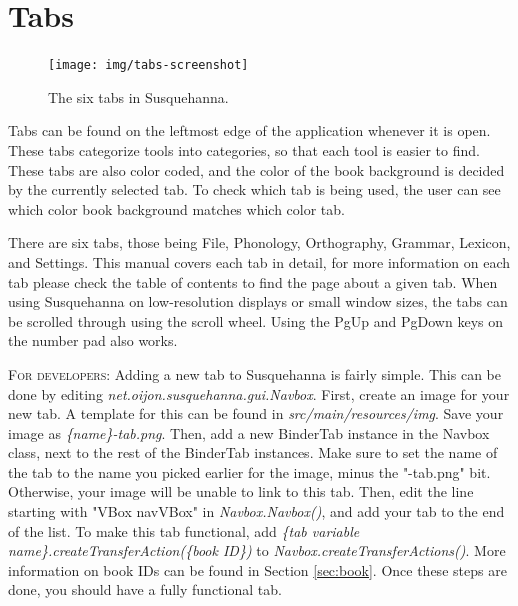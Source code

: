 \documentclass{report}
\begin{document}
	\section{Tabs}\label{sec:tabs}
	\begin{figure}
		\centering
		\texttt{[image: img/tabs-screenshot]}
		\caption{The six tabs in Susquehanna.}
		\label{fig:tabs-screenshot}
	\end{figure}
	Tabs can be found on the leftmost edge of the application whenever it is open. These tabs categorize tools into categories,	so that each tool is easier to find. These tabs are also color coded, and the color of the book background is decided by the currently selected tab. To check which tab is being used, the user can see which color book background matches which color tab.
	\par
	There are six tabs, those being File, Phonology, Orthography, Grammar, Lexicon, and Settings. This manual covers each tab in detail, for more information on each tab please check the table of contents to find the page about a given tab. When using Susquehanna on low-resolution displays or small window sizes, the tabs can be scrolled through using the scroll wheel. Using the PgUp and PgDown keys on the number pad also works. 
	\par
	\begin{tcolorbox}[width=1\textwidth]
	\textsc{For developers:} Adding a new tab to Susquehanna is fairly simple. This can be done by editing \emph{net.oijon.susquehanna.gui.Navbox}. First, create an image for your new tab. A template for this can be found in \emph{src/main/resources/img}. Save your image as \emph{\{name\}-tab.png}. Then, add a new BinderTab instance in the Navbox class, next to the rest of the BinderTab instances. Make sure to set the name of the tab to the name you picked earlier for the image, minus the "-tab.png" bit. Otherwise, your image will be unable to link to this tab. Then, edit the line starting with "VBox navVBox" in \emph{Navbox.Navbox()}, and add your tab to the end of the list. To make this tab functional, add \emph{\{tab variable name\}.createTransferAction(\{book ID\})} to \emph{Navbox.createTransferActions()}. More information on book IDs can be found in Section \ref{sec:book}. Once these steps are done, you should have a fully functional tab.
	\end{tcolorbox}
\end{document}
